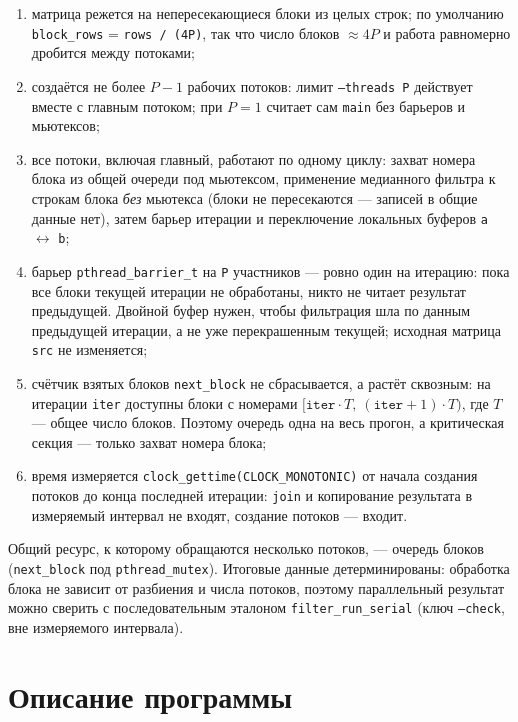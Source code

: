 \begin{enumerate}
  \item матрица режется на непересекающиеся блоки из целых строк; по умолчанию
    \texttt{block\_rows} = \texttt{rows / (4P)}, так что число блоков $\approx 4P$ и работа
    равномерно дробится между потоками;
  \item создаётся не более $P-1$ рабочих потоков: лимит \texttt{--threads P} действует вместе
    с главным потоком; при $P=1$ считает сам \texttt{main} без барьеров и мьютексов;
  \item все потоки, включая главный, работают по одному циклу: захват номера блока из общей
    очереди под мьютексом, применение медианного фильтра к строкам блока \emph{без} мьютекса
    (блоки не пересекаются --- записей в общие данные нет), затем барьер итерации и
    переключение локальных буферов \texttt{a} $\leftrightarrow$ \texttt{b};
  \item барьер \texttt{pthread\_barrier\_t} на \texttt{P} участников --- ровно один на
    итерацию: пока все блоки текущей итерации не обработаны, никто не читает результат
    предыдущей. Двойной буфер нужен, чтобы фильтрация шла по данным предыдущей итерации, а не
    уже перекрашенным текущей; исходная матрица \texttt{src} не изменяется;
  \item счётчик взятых блоков \texttt{next\_block} не сбрасывается, а растёт сквозным: на
    итерации \texttt{iter} доступны блоки с номерами
    $[\texttt{iter}\cdot T,\ (\texttt{iter}+1)\cdot T)$, где $T$ --- общее число блоков.
    Поэтому очередь одна на весь прогон, а критическая секция --- только захват номера блока;
  \item время измеряется \texttt{clock\_gettime(CLOCK\_MONOTONIC)} от начала создания потоков
    до конца последней итерации: \texttt{join} и копирование результата в измеряемый интервал
    не входят, создание потоков --- входит.
\end{enumerate}

Общий ресурс, к которому обращаются несколько потоков, --- очередь блоков
(\texttt{next\_block} под \texttt{pthread\_mutex}). Итоговые данные детерминированы: обработка
блока не зависит от разбиения и числа потоков, поэтому параллельный результат можно сверить с
последовательным эталоном \texttt{filter\_run\_serial} (ключ \texttt{--check}, вне измеряемого
интервала).

\section{Описание программы}

